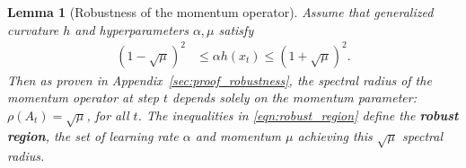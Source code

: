 \documentclass{article}
\newtheorem{lemma}[theorem]{Lemma}
\newcommand{\mat}[1]{\bm{\mathit{#1}}}
\begin{document}
\begin{lemma}[Robustness of the momentum operator]
\label{lem:robustness}
Assume that generalized curvature $h$ and hyperparameters $\alpha,\mu$ satisfy
\begin{align}
{(1-\sqrt{\mu})^2} &\leq \alpha h(x_t) \leq {(1+\sqrt{\mu})^2}.
\label{eqn:robust_region}
\end{align}
Then as proven in Appendix~\ref{sec:proof_robustness}, the spectral radius of the momentum operator at step $t$ depends solely on the  momentum parameter: $	\rho(\mat{A}_t) = \sqrt{\mu}$, for all $t$. 
The inequalities in \eqref{eqn:robust_region} define the {\bf robust region}, the set of learning rate $\alpha$ and momentum $\mu$ achieving this $\sqrt{\mu}$ spectral radius.
\end{lemma}
\end{document}
